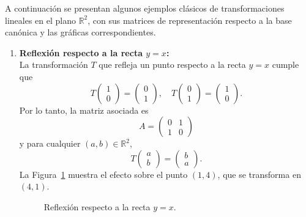 \begin{example}
A continuación se presentan algunos ejemplos clásicos de transformaciones lineales en el plano $\mathbb{R}^2$, con sus matrices de representación respecto a la base canónica y las gráficas correspondientes.

\begin{enumerate}[$a)$]
    \item \textbf{Reflexión respecto a la recta $y = x$:} \\
    La transformación $T$ que refleja un punto respecto a la recta $y = x$ cumple que
    \[
    T\begin{pmatrix}1\\0\end{pmatrix} = \begin{pmatrix}0\\1\end{pmatrix}, \quad
    T\begin{pmatrix}0\\1\end{pmatrix} = \begin{pmatrix}1\\0\end{pmatrix}.
    \]
    Por lo tanto, la matriz asociada es
    \[
    A = \begin{pmatrix}0 & 1 \\ 1 & 0\end{pmatrix}
    \]
    y para cualquier $(a, b) \in \mathbb{R}^2$,
    \[
    T\begin{pmatrix}a\\b\end{pmatrix} = \begin{pmatrix}b\\a\end{pmatrix}.
    \]
    La Figura~\ref{fig:reflexion_recta_yx} muestra el efecto sobre el punto $(1,4)$, que se transforma en $(4,1)$.
    \begin{figure}[!htbp]\centering
        \caption{Reflexión respecto a la recta $y = x$.}\label{fig:reflexion_recta_yx}
    \end{figure}


\end{enumerate}
\end{example}
